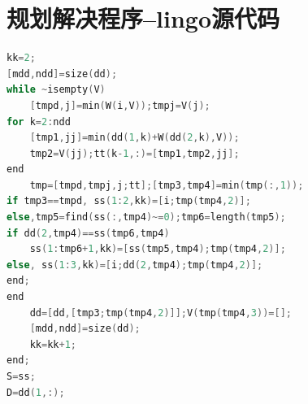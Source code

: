 \documentclass{cumcmthesis}
\begin{document}
\begin{appendices}
\begin{lstlisting}[language=matlab]
 \end{lstlisting}

 \section{规划解决程序--lingo源代码}

\begin{lstlisting}[language=c]
kk=2;
[mdd,ndd]=size(dd);
while ~isempty(V)
    [tmpd,j]=min(W(i,V));tmpj=V(j);
for k=2:ndd
    [tmp1,jj]=min(dd(1,k)+W(dd(2,k),V));
    tmp2=V(jj);tt(k-1,:)=[tmp1,tmp2,jj];
end
    tmp=[tmpd,tmpj,j;tt];[tmp3,tmp4]=min(tmp(:,1));
if tmp3==tmpd, ss(1:2,kk)=[i;tmp(tmp4,2)];
else,tmp5=find(ss(:,tmp4)~=0);tmp6=length(tmp5);
if dd(2,tmp4)==ss(tmp6,tmp4)
    ss(1:tmp6+1,kk)=[ss(tmp5,tmp4);tmp(tmp4,2)];
else, ss(1:3,kk)=[i;dd(2,tmp4);tmp(tmp4,2)];
end;
end
    dd=[dd,[tmp3;tmp(tmp4,2)]];V(tmp(tmp4,3))=[];
    [mdd,ndd]=size(dd);
    kk=kk+1;
end;
S=ss;
D=dd(1,:);
 \end{lstlisting}
\end{appendices}
\end{document}
